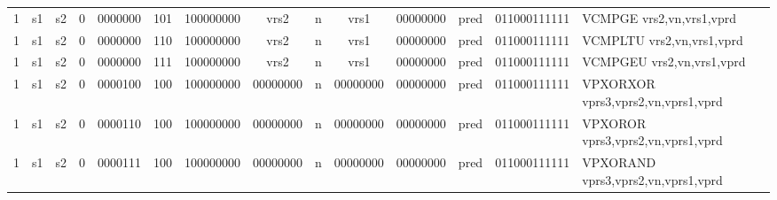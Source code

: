 \begin{landscape}
\begin{table}[p]
\begin{small}
\begin{center}
\begin{tabular}{p{0.08in}@{}p{0.08in}@{}p{0.08in}@{}p{0.08in}@{}p{0.50in}@{}p{0.30in}@{}p{0.08in}@{}p{0.8in}@{}p{0.48in}@{}p{0.32in}@{}p{0.08in}@{}p{0.8in}@{}p{0.8in}@{}p{0.4in}@{}p{0.56in}l}
\multicolumn{1}{|c|}{1} &
\multicolumn{1}{c|}{s1} &
\multicolumn{1}{c|}{s2} &
\multicolumn{1}{c|}{0} &
\multicolumn{1}{c|}{0000000} &
\multicolumn{1}{c|}{101} &
\multicolumn{2}{c|}{100000000} &
\multicolumn{2}{c|}{vrs2} &
\multicolumn{1}{c|}{n} &
\multicolumn{1}{c|}{vrs1} &
\multicolumn{1}{c|}{00000000} &
\multicolumn{1}{c|}{pred} &
\multicolumn{1}{c|}{011000111111} & VCMPGE vrs2,vn,vrs1,vprd \\
\cline{1-15}
  

\multicolumn{1}{|c|}{1} &
\multicolumn{1}{c|}{s1} &
\multicolumn{1}{c|}{s2} &
\multicolumn{1}{c|}{0} &
\multicolumn{1}{c|}{0000000} &
\multicolumn{1}{c|}{110} &
\multicolumn{2}{c|}{100000000} &
\multicolumn{2}{c|}{vrs2} &
\multicolumn{1}{c|}{n} &
\multicolumn{1}{c|}{vrs1} &
\multicolumn{1}{c|}{00000000} &
\multicolumn{1}{c|}{pred} &
\multicolumn{1}{c|}{011000111111} & VCMPLTU vrs2,vn,vrs1,vprd \\
\cline{1-15}
  

\multicolumn{1}{|c|}{1} &
\multicolumn{1}{c|}{s1} &
\multicolumn{1}{c|}{s2} &
\multicolumn{1}{c|}{0} &
\multicolumn{1}{c|}{0000000} &
\multicolumn{1}{c|}{111} &
\multicolumn{2}{c|}{100000000} &
\multicolumn{2}{c|}{vrs2} &
\multicolumn{1}{c|}{n} &
\multicolumn{1}{c|}{vrs1} &
\multicolumn{1}{c|}{00000000} &
\multicolumn{1}{c|}{pred} &
\multicolumn{1}{c|}{011000111111} & VCMPGEU vrs2,vn,vrs1,vprd \\
\cline{1-15}
  

\multicolumn{1}{|c|}{1} &
\multicolumn{1}{c|}{s1} &
\multicolumn{1}{c|}{s2} &
\multicolumn{1}{c|}{0} &
\multicolumn{1}{c|}{0000100} &
\multicolumn{1}{c|}{100} &
\multicolumn{2}{c|}{100000000} &
\multicolumn{2}{c|}{00000000} &
\multicolumn{1}{c|}{n} &
\multicolumn{1}{c|}{00000000} &
\multicolumn{1}{c|}{00000000} &
\multicolumn{1}{c|}{pred} &
\multicolumn{1}{c|}{011000111111} & VPXORXOR vprs3,vprs2,vn,vprs1,vprd \\
\cline{1-15}
  

\multicolumn{1}{|c|}{1} &
\multicolumn{1}{c|}{s1} &
\multicolumn{1}{c|}{s2} &
\multicolumn{1}{c|}{0} &
\multicolumn{1}{c|}{0000110} &
\multicolumn{1}{c|}{100} &
\multicolumn{2}{c|}{100000000} &
\multicolumn{2}{c|}{00000000} &
\multicolumn{1}{c|}{n} &
\multicolumn{1}{c|}{00000000} &
\multicolumn{1}{c|}{00000000} &
\multicolumn{1}{c|}{pred} &
\multicolumn{1}{c|}{011000111111} & VPXOROR vprs3,vprs2,vn,vprs1,vprd \\
\cline{1-15}
  

\multicolumn{1}{|c|}{1} &
\multicolumn{1}{c|}{s1} &
\multicolumn{1}{c|}{s2} &
\multicolumn{1}{c|}{0} &
\multicolumn{1}{c|}{0000111} &
\multicolumn{1}{c|}{100} &
\multicolumn{2}{c|}{100000000} &
\multicolumn{2}{c|}{00000000} &
\multicolumn{1}{c|}{n} &
\multicolumn{1}{c|}{00000000} &
\multicolumn{1}{c|}{00000000} &
\multicolumn{1}{c|}{pred} &
\multicolumn{1}{c|}{011000111111} & VPXORAND vprs3,vprs2,vn,vprs1,vprd \\
\cline{1-15}
  


\end{tabular}
\end{center}
\end{small}
\end{table}
\end{landscape}
